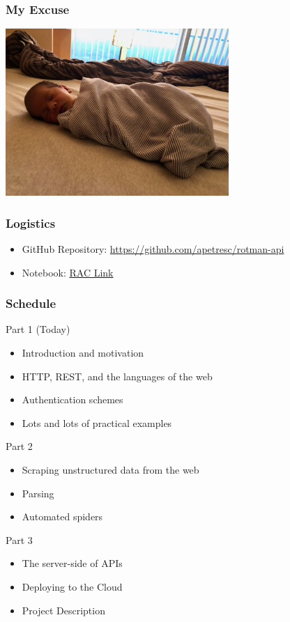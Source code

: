 \documentclass{beamer}
\begin{document}
\begin{frame}
  \frametitle{My Excuse}
  \begin{center}
    \includegraphics[width=320]{img/calvin.jpg}
  \end{center}
\end{frame}


\begin{frame}
  \frametitle{Logistics}
  
  \begin{itemize}
    \item GitHub Repository: \href{https://github.com/apetresc/rotman-api}{https://github.com/apetresc/rotman-api}
    \item Notebook: \href{https://rac.rotman.utoronto.ca/jupyter/user/ut_apetrescu/lab/tree/Day1.ipynb}{RAC Link}
  \end{itemize}
\end{frame}


\begin{frame}
  \frametitle{Schedule}
  
  \alert{Part 1 (Today)}
  \begin{itemize}
    \item Introduction and motivation
    \item HTTP, REST, and the languages of the web
    \item Authentication schemes
    \item Lots and lots of practical examples
  \end{itemize}

  Part 2
  \begin{itemize}
    \item Scraping unstructured data from the web
    \item Parsing 
    \item Automated spiders
  \end{itemize}

  Part 3
  \begin{itemize}
    \item The server-side of APIs
    \item Deploying to the Cloud
    \item Project Description
  \end{itemize}
\end{frame}
\end{document}
